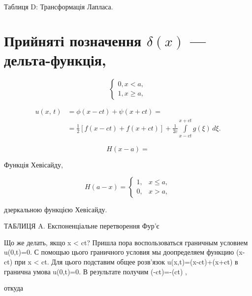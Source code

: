 \documentclass[
  ukrainian,
]{article}
\begin{document}
Таблиця D: Трансформація Лапласа.

\section{\texorpdfstring{Прийняті позначення \(\delta\left(x\right)\)
---
дельта-функція,}{Прийняті позначення \textbackslash delta\textbackslash left(x\textbackslash right) --- дельта-функція,}}\label{ux43fux440ux438ux439ux43dux44fux442ux456-ux43fux43eux437ux43dux430ux447ux435ux43dux43dux44f-deltaleftxright-ux434ux435ux43bux44cux442ux430-ux444ux443ux43dux43aux446ux456ux44f}

\[
\begin{cases} 0, x < a, \\ 1, x \geqslant a, \end{cases}
\]

\[
\begin{split} u\left(x,\,t\right) &= \phi\left(x-ct\right) + \psi\left(x+ct\right) = \\ &= \frac{1}{2} \left[ f\left(x-ct\right) + f\left(x+ct\right) \right] + \frac{1}{2c} \int\limits_{x-ct}^{x+ct} g\left(\xi\right) \, d\xi. \end{split}
\]

\[
H(x-a) =
\]

Функція Хевісайду,

\[
H(a-x) = \begin{cases} 1, & x \leqslant a, \\ 0, & x > a, \end{cases}
\]

дзеркальною функцією Хевісайду.

ТАБЛИЦЯ A. Експоненціальне перетворення Фур'є

Що же делать, якщо x \textless{} ct? Пришла пора воспользоваться
граничным условием u(0,t)=0. С помощью цього граничного условия мы
доопределяем функцию \varphi(x-ct) при x \textless{} ct. Для цього
подставим общее розв'язок u(x,t)=\varphi(x-ct)+\psi(x+ct) в гранична
умова u(0,t)=0. В результате получим \varphi(-ct)=-\psi(ct) ,

откуда
\end{document}
